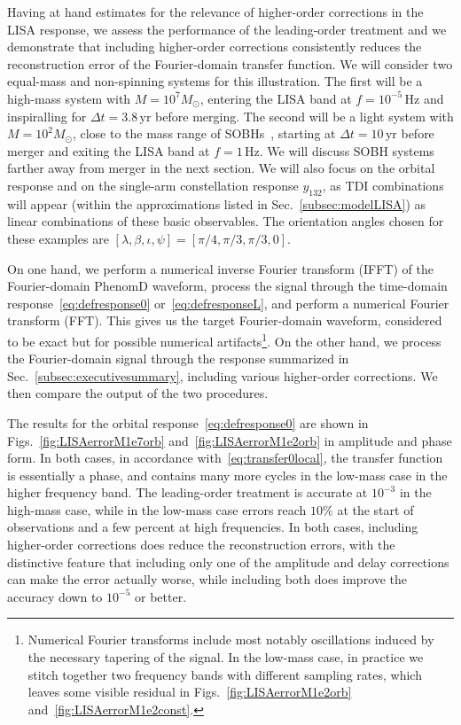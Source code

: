 \documentclass[aps,showpacs,twocolumn,
prd,superscriptaddress,nofootinbib]{revtex4-1}
\newcommand{\Hz}{\,\mathrm{Hz}}
\newcommand{\yr}{\,\mathrm{yr}}
\newcommand{\Msol}{M_{\odot}}
\begin{document}
Having at hand estimates for the relevance of higher-order corrections in the LISA response, we assess the performance of the leading-order treatment and we demonstrate that including higher-order corrections consistently reduces the reconstruction error of the Fourier-domain transfer function. We will consider two equal-mass and non-spinning systems for this illustration. The first will be a high-mass system with $M=10^{7} \Msol$, entering the LISA band at $f=10^{-5}\Hz$ and inspiralling for $\Delta t = 3.8 \yr$ before merging. The second will be a light system with $M=10^{2} \Msol$, close to the mass range of SOBHs~\cite{Sesana16}, starting at $\Delta t = 10\yr$ before merger and exiting the LISA band at $f=1\Hz$. We will discuss SOBH systems farther away from merger in the next section. We will also focus on the orbital response and on the single-arm constellation response $y_{132}$, as TDI combinations will appear (within the approximations listed in Sec.~\ref{subsec:modelLISA}) as linear combinations of these basic observables. The orientation angles chosen for these examples are $[\lambda,\beta,\iota,\psi] = [\pi/4,\pi/3,\pi/3,0]$.

On one hand, we perform a numerical inverse Fourier transform (IFFT) of the Fourier-domain PhenomD waveform, process the signal through the time-domain response~\eqref{eq:defresponse0} or~\eqref{eq:defresponseL}, and perform a numerical Fourier transform (FFT). This gives us the target Fourier-domain waveform, considered to be exact but for possible numerical artifacts\footnote{Numerical Fourier transforms include most notably oscillations induced by the necessary tapering of the signal. In the low-mass case, in practice we stitch together two frequency bands with different sampling rates, which leaves some visible residual in Figs.~\ref{fig:LISAerrorM1e2orb} and~\ref{fig:LISAerrorM1e2const}.}. On the other hand, we process the Fourier-domain signal through the response summarized in Sec.~\ref{subsec:executivesummary}, including various higher-order corrections. We then compare the output of the two procedures.

The results for the orbital response~\eqref{eq:defresponse0} are shown in Figs.~\ref{fig:LISAerrorM1e7orb} and~\ref{fig:LISAerrorM1e2orb} in amplitude and phase form. In both cases, in accordance with~\eqref{eq:transfer0local}, the transfer function is essentially a phase, and contains many more cycles in the low-mass case in the higher frequency band. The leading-order treatment is accurate at $10^{-3}$ in the high-mass case, while in the low-mass case errors reach $10\%$ at the start of observations and a few percent at high frequencies. In both cases, including higher-order corrections does reduce the reconstruction errors, with the distinctive feature that including only one of the amplitude and delay corrections can make the error actually worse, while including both does improve the accuracy down to $10^{-5}$ or better.
\end{document}
